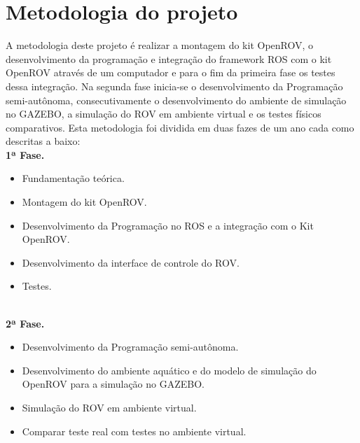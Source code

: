 \chapter{Metodologia do projeto}

A metodologia deste projeto é realizar a montagem do kit OpenROV, o desenvolvimento da programação e integração do framework ROS com o kit OpenROV através de um computador e para o fim da primeira fase os testes dessa integração. Na segunda fase inicia-se o desenvolvimento da Programação semi-autônoma, consecutivamente o desenvolvimento do ambiente de simulação no GAZEBO, a simulação do ROV em ambiente virtual e os testes físicos comparativos. Esta metodologia foi dividida em duas fazes de um ano cada como descritas a baixo:\\
\textbf{\large 1ª Fase.}
\begin{itemize}
	\item Fundamentação teórica.
	\item Montagem do kit OpenROV.
	\item Desenvolvimento da Programação no ROS e a integração com o Kit OpenROV.
	\item Desenvolvimento da interface de controle do ROV. 
	\item Testes. 

\end{itemize}\\
\textbf{\large 2ª Fase.}
\begin{itemize}
	\item Desenvolvimento da Programação semi-autônoma. 
	\item Desenvolvimento do ambiente aquático e do modelo de simulação do OpenROV para a simulação no GAZEBO.
	\item Simulação do ROV em ambiente virtual.
	\item Comparar teste real com testes no ambiente virtual. 
\end{itemize}





